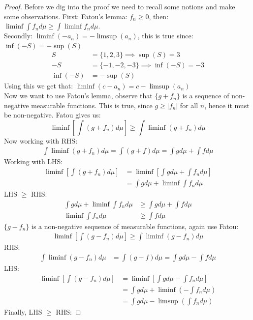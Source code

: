 \documentclass{article}
\newtheorem{proof}{Proof}
\begin{document}
\begin{proof}
Before we dig into the proof we need to recall some notions and make some observations. First: Fatou's lemma: $f_{n}\geq 0$, then: \\
$\liminf \int f_{n}d\mu \geq \int \liminf f_{n}d\mu$. \\
Secondly: $\liminf(-a_{n}) = -\limsup(a_{n})$, this is true since: 
$\inf(-S) = -\sup(S)$
\begin{align*}
S &= \{1,2,3\} \implies \sup(S) = 3 \\ 
-S &= \{-1,-2,-3\} \implies \inf(-S) = -3 \\ 
\inf(-S) &= -\sup(S) 
\end{align*}
Using this we get that: $\liminf(c-a_{n}) = c -\limsup(a_{n})$\\ 
Now we want to use Fatou's lemma, observe that $\{g+f_{n}\}$ is a sequence of non-negative measurable functions. This is true, since $g \geq |f_{n}|$ for all $n$, hence it must be non-negative. Fatou gives us: 
\[\liminf \left[\int (g+f_{n})d\mu\right] \geq \int \liminf (g+f_{n})d\mu
\] 
Now working with RHS: 
\begin{align*}
\int \liminf (g+f_{n})d\mu = \int (g+f)d\mu = \int gd\mu + \int fd\mu
\end{align*}
Working with LHS: 
\begin{align*}
\liminf \left[\int (g+f_{n})d\mu\right] &= \liminf \left[\int gd\mu +\int f_{n}d\mu \right]\\ 
&= \int gd\mu + \liminf \int f_{n}d\mu
\end{align*} 
LHS $\geq$ RHS: 
\begin{align*}
\int gd\mu + \liminf \int f_{n}d\mu &\geq \int gd\mu + \int fd\mu \\
\liminf \int f_{n}d\mu &\geq \int fd\mu
\end{align*}
$\{g-f_{n}\}$ is a non-negative sequence of measurable functions, again use Fatou:
\begin{align*}
\liminf \left[\int (g-f_{n})d\mu\right] \geq \int \liminf (g-f_{n})d\mu
\end{align*}
RHS: 
\begin{align*}
\int \liminf (g-f_{n})d\mu &= \int (g-f)d\mu = \int gd\mu - \int fd\mu
\end{align*}
LHS: 
\begin{align*}
\liminf \left[\int (g-f_{n})d\mu\right] &=   \liminf \left[\int gd\mu- \int f_{n}d\mu\right]\\ 
&= \int gd\mu + \liminf\left(-\int f_{n}d\mu\right) \\ 
&= \int gd\mu - \limsup\left(\int f_{n}d\mu\right)
\end{align*}
Finally, LHS $\geq$ RHS: 


\end{proof}
\end{document}
